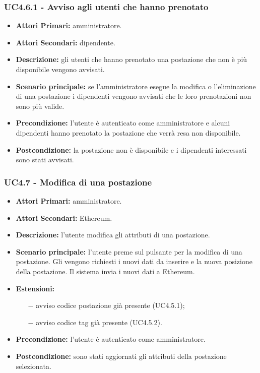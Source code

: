 \subsubsection{ UC4.6.1 - Avviso agli utenti che hanno prenotato}
\begin{itemize}
	\item\textbf{Attori Primari:}
	amministratore.
	\item\textbf{Attori Secondari:}
	dipendente.
	\item\textbf{Descrizione:}
	gli utenti che hanno prenotato una postazione che non è più disponibile vengono avvisati.
	\item\textbf{Scenario principale:}
	se l'amministratore esegue la modifica o l'eliminazione di una postazione i dipendenti vengono avvisati che le loro prenotazioni non sono più valide.
	\item\textbf{Precondizione:}
	l'utente è autenticato come amministratore e alcuni dipendenti hanno prenotato la postazione che verrà resa non disponibile.
	\item\textbf{Postcondizione:}
	la postazione non è disponibile e i dipendenti interessati sono stati avvisati.
\end{itemize}

\subsubsection{ UC4.7 - Modifica di una postazione}
\begin{itemize}
	\item\textbf{Attori Primari:}
	amministratore.
	\item\textbf{Attori Secondari:}
	Ethereum.
	\item\textbf{Descrizione:}
	l'utente modifica gli attributi di una postazione.
	\item\textbf{Scenario principale:} 
	l'utente preme sul pulsante per la modifica di una postazione. Gli vengono richiesti i nuovi dati da inserire e la nuova posizione della postazione. Il sistema invia i nuovi dati a Ethereum.
	\item\textbf{Estensioni:}
	\begin{itemize}
		\item[$-$] avviso codice postazione già presente (UC4.5.1);
		\item[$-$] avviso codice tag già presente (UC4.5.2).
	\end{itemize}
	\item\textbf{Precondizione:} 
	l'utente è autenticato come amministratore.
	\item\textbf{Postcondizione:}
	sono stati aggiornati gli attributi della postazione selezionata.
\end{itemize}

